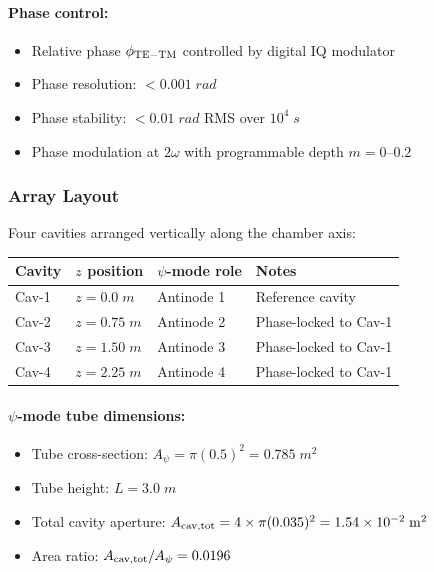 \documentclass[11pt,a4paper]{article}
\begin{document}
\paragraph{Phase control:}
\begin{itemize}[nosep]
\item Relative phase $\phi_{\rm TE-TM}$ controlled by digital
IQ modulator
\item Phase resolution: $< 0.001\;\si{rad}$
\item Phase stability: $< 0.01\;\si{rad}$ RMS over $10^4\;\si{s}$
\item Phase modulation at $2\omega$ with programmable depth
$m = 0$--$0.2$
\end{itemize}

\subsubsection{Array Layout}

Four cavities arranged vertically along the chamber axis:

\begin{longtable}{p{}p{}p{}p{}}
\toprule
\textbf{Cavity} & \textbf{$z$ position} & \textbf{$\psi$-mode role} & \textbf{Notes} \\
\midrule
\endhead
Cav-1 & $z = 0.0\;\si{m}$ & Antinode 1 & Reference cavity \\
Cav-2 & $z = 0.75\;\si{m}$ & Antinode 2 & Phase-locked to Cav-1 \\
Cav-3 & $z = 1.50\;\si{m}$ & Antinode 3 & Phase-locked to Cav-1 \\
Cav-4 & $z = 2.25\;\si{m}$ & Antinode 4 & Phase-locked to Cav-1 \\
\bottomrule
\end{longtable}

\paragraph{$\psi$-mode tube dimensions:}
\begin{itemize}[nosep]
\item Tube cross-section: $A_\psi = \pi(0.5)^2 = 0.785\;\si{m^2}$
\item Tube height: $L = 3.0\;\si{m}$
\item Total cavity aperture: $A_{\rm cav,tot} = 4 \times \pi(0.035)^2
= 1.54 \times 10^{-2}\;\si{m^2}$
\item Area ratio: $A_{\rm cav,tot}/A_\psi = 0.0196$
\end{itemize}
\end{document}
